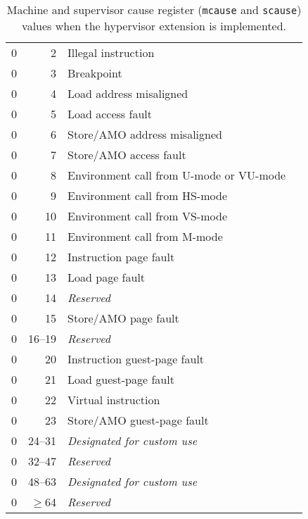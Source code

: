 \begin{table*}[p]
\begin{center}
\begin{tabular}{|r|r|l|l|}
  0         & 2               & Illegal instruction \\
  0         & 3               & Breakpoint \\
  0         & 4               & Load address misaligned \\
  0         & 5               & Load access fault \\
  0         & 6               & Store/AMO address misaligned \\
  0         & 7               & Store/AMO access fault \\
  0         & 8               & Environment call from U-mode or VU-mode \\
  0         & 9               & Environment call from HS-mode \\
  0         & 10              & Environment call from VS-mode \\
  0         & 11              & Environment call from M-mode \\
  0         & 12              & Instruction page fault \\
  0         & 13              & Load page fault \\
  0         & 14              & {\em Reserved} \\
  0         & 15              & Store/AMO page fault \\
  0         & 16--19          & {\em Reserved} \\
  0         & 20              & Instruction guest-page fault \\
  0         & 21              & Load guest-page fault \\
  0         & 22              & Virtual instruction \\
  0         & 23              & Store/AMO guest-page fault \\
  0         & 24--31          & {\em Designated for custom use} \\
  0         & 32--47          & {\em Reserved} \\
  0         & 48--63          & {\em Designated for custom use} \\
  0         & $\ge$64         & {\em Reserved} \\
  \hline
\end{tabular}
\end{center}
\caption{Machine and supervisor cause register ({\tt mcause} and
{\tt scause}) values when the hypervisor extension is implemented.}
\label{hcauses}
\end{table*}

